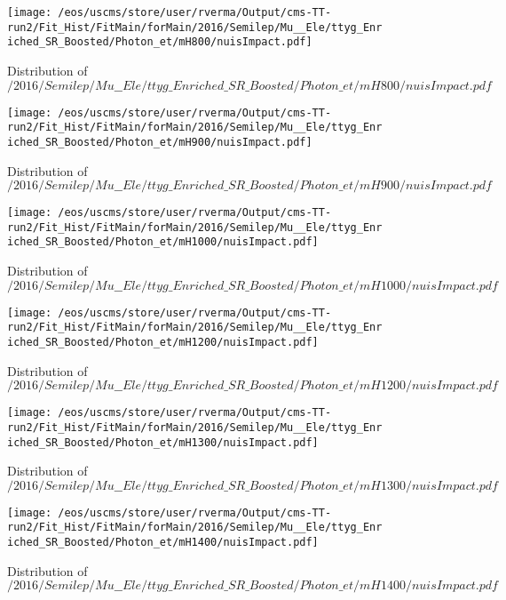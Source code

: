 \begin{figure}
\centering
\texttt{[image: /eos/uscms/store/user/rverma/Output/cms-TT-run2/Fit\_Hist/FitMain/forMain/2016/Semilep/Mu\_\_Ele/ttyg\_Enriched\_SR\_Boosted/Photon\_et/mH800/nuisImpact.pdf]}
\caption{Distribution of $/2016/Semilep/Mu\_\_Ele/ttyg\_Enriched\_SR\_Boosted/Photon\_et/mH800/nuisImpact.pdf$}
\end{figure}

\begin{figure}
\centering
\texttt{[image: /eos/uscms/store/user/rverma/Output/cms-TT-run2/Fit\_Hist/FitMain/forMain/2016/Semilep/Mu\_\_Ele/ttyg\_Enriched\_SR\_Boosted/Photon\_et/mH900/nuisImpact.pdf]}
\caption{Distribution of $/2016/Semilep/Mu\_\_Ele/ttyg\_Enriched\_SR\_Boosted/Photon\_et/mH900/nuisImpact.pdf$}
\end{figure}

\begin{figure}
\centering
\texttt{[image: /eos/uscms/store/user/rverma/Output/cms-TT-run2/Fit\_Hist/FitMain/forMain/2016/Semilep/Mu\_\_Ele/ttyg\_Enriched\_SR\_Boosted/Photon\_et/mH1000/nuisImpact.pdf]}
\caption{Distribution of $/2016/Semilep/Mu\_\_Ele/ttyg\_Enriched\_SR\_Boosted/Photon\_et/mH1000/nuisImpact.pdf$}
\end{figure}

\begin{figure}
\centering
\texttt{[image: /eos/uscms/store/user/rverma/Output/cms-TT-run2/Fit\_Hist/FitMain/forMain/2016/Semilep/Mu\_\_Ele/ttyg\_Enriched\_SR\_Boosted/Photon\_et/mH1200/nuisImpact.pdf]}
\caption{Distribution of $/2016/Semilep/Mu\_\_Ele/ttyg\_Enriched\_SR\_Boosted/Photon\_et/mH1200/nuisImpact.pdf$}
\end{figure}

\begin{figure}
\centering
\texttt{[image: /eos/uscms/store/user/rverma/Output/cms-TT-run2/Fit\_Hist/FitMain/forMain/2016/Semilep/Mu\_\_Ele/ttyg\_Enriched\_SR\_Boosted/Photon\_et/mH1300/nuisImpact.pdf]}
\caption{Distribution of $/2016/Semilep/Mu\_\_Ele/ttyg\_Enriched\_SR\_Boosted/Photon\_et/mH1300/nuisImpact.pdf$}
\end{figure}

\begin{figure}
\centering
\texttt{[image: /eos/uscms/store/user/rverma/Output/cms-TT-run2/Fit\_Hist/FitMain/forMain/2016/Semilep/Mu\_\_Ele/ttyg\_Enriched\_SR\_Boosted/Photon\_et/mH1400/nuisImpact.pdf]}
\caption{Distribution of $/2016/Semilep/Mu\_\_Ele/ttyg\_Enriched\_SR\_Boosted/Photon\_et/mH1400/nuisImpact.pdf$}
\end{figure}

